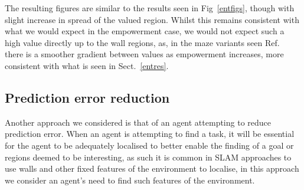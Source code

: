 \documentclass{article}
\begin{document}

The resulting figures are similar to the results seen in Fig~\ref{entfigs}, 
though with slight increase in spread of the valued region. Whilst this remains consistent with what we would expect in the empowerment case, we would not expect such a high value directly up to the wall regions, as, in the maze variants seen Ref.~\cite{klyubin2005empowerment} there is a smoother gradient between values as empowerment increases, more consistent with what is seen in Sect.~\ref{entres}. %

\subsection{Prediction error reduction\label{prederr}}
Another approach we considered is that of an agent attempting to reduce prediction error. When an agent is attempting to find a task, it will be essential for the agent to be adequately localised to better enable the finding of a goal or regions deemed to be interesting, as such it is common in SLAM approaches to use walls and other fixed features of the environment to localise, in this approach we consider an agent's need to find such features of the environment.
\end{document}

